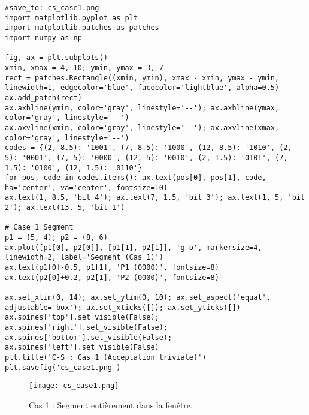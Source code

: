 \documentclass{article}
\begin{document}
\begin{verbatim}
#save_to: cs_case1.png
import matplotlib.pyplot as plt
import matplotlib.patches as patches
import numpy as np

fig, ax = plt.subplots()
xmin, xmax = 4, 10; ymin, ymax = 3, 7
rect = patches.Rectangle((xmin, ymin), xmax - xmin, ymax - ymin, linewidth=1, edgecolor='blue', facecolor='lightblue', alpha=0.5)
ax.add_patch(rect)
ax.axhline(ymin, color='gray', linestyle='--'); ax.axhline(ymax, color='gray', linestyle='--')
ax.axvline(xmin, color='gray', linestyle='--'); ax.axvline(xmax, color='gray', linestyle='--')
codes = {(2, 8.5): '1001', (7, 8.5): '1000', (12, 8.5): '1010', (2, 5): '0001', (7, 5): '0000', (12, 5): '0010', (2, 1.5): '0101', (7, 1.5): '0100', (12, 1.5): '0110'}
for pos, code in codes.items(): ax.text(pos[0], pos[1], code, ha='center', va='center', fontsize=10)
ax.text(1, 8.5, 'bit 4'); ax.text(7, 1.5, 'bit 3'); ax.text(1, 5, 'bit 2'); ax.text(13, 5, 'bit 1')

# Case 1 Segment
p1 = (5, 4); p2 = (8, 6)
ax.plot([p1[0], p2[0]], [p1[1], p2[1]], 'g-o', markersize=4, linewidth=2, label='Segment (Cas 1)')
ax.text(p1[0]-0.5, p1[1], 'P1 (0000)', fontsize=8)
ax.text(p2[0]+0.2, p2[1], 'P2 (0000)', fontsize=8)

ax.set_xlim(0, 14); ax.set_ylim(0, 10); ax.set_aspect('equal', adjustable='box'); ax.set_xticks([]); ax.set_yticks([])
ax.spines['top'].set_visible(False); ax.spines['right'].set_visible(False); ax.spines['bottom'].set_visible(False); ax.spines['left'].set_visible(False)
plt.title('C-S : Cas 1 (Acceptation triviale)')
plt.savefig('cs_case1.png')
\end{verbatim}
\begin{figure}[H] \centering \texttt{[image: cs\_case1.png]} \caption{Cas 1 : Segment entièrement dans la fenêtre.} \label{fig:cs_case1} \end{figure}
\end{document}
